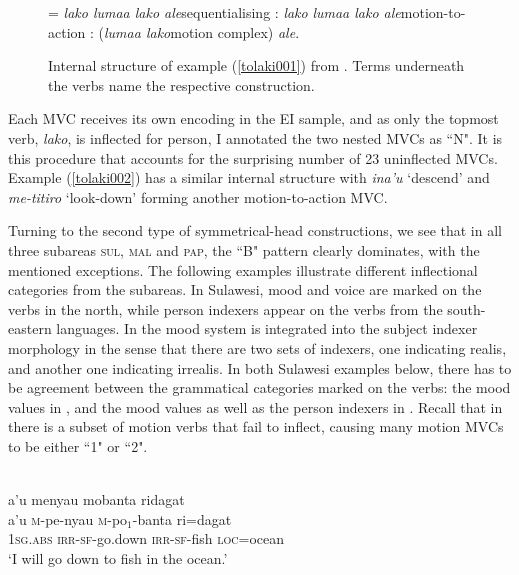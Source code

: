 \begin{figure}[h]
\jtree[xunit=8em,yunit=1em]
\! = {\textit{lako lumaa lako ale}}{sequentialising}
: {\textit{lako}} {\textit{lumaa lako ale}}{motion-to-action}
: ({\textit{lumaa lako}}{motion complex}) {\textit{ale}}.
\endjtree
\caption[Internal structure of example (\ref{tolaki001}) from ]{Internal structure of example (\ref{tolaki001}) from . Terms underneath the verbs name the respective construction.}
\label{figure:tolakiMVC}
\end{figure}

Each MVC receives its own encoding in the EI sample, and as only the topmost verb, \textit{lako}, is inflected for person, I annotated the two nested MVCs as ``N". It is this procedure that accounts for the surprising number of 23 uninflected  MVCs. Example (\ref{tolaki002}) has a similar internal structure with \textit{ina'u} `descend' and \textit{me-titiro} `look-down' forming another motion-to-action MVC.

Turning to the second type of symmetrical-head constructions, we see that in all three subareas \textsc{sul}, \textsc{mal} and \textsc{pap}, the ``B" pattern clearly dominates, with the mentioned exceptions. The following examples illustrate different inflectional categories from the subareas. In Sulawesi, mood and voice are marked on the verbs in the north, while person indexers appear on the verbs from the south-eastern languages. In  the mood system is integrated into the subject indexer morphology in the sense that there are two sets of indexers, one indicating realis, and another one indicating irrealis. In both Sulawesi examples below, there has to be agreement between the grammatical categories marked on the verbs: the mood values in , and the mood values as well as the person indexers in . Recall that in  there is a subset of motion verbs that fail to inflect, causing many motion MVCs to be either ``1" or ``2".

\ea 
{}\\
\glll a'u menyau mobanta ridagat \\
a'u \textsc{m}-pe-nyau \textsc{m}-po$_1$-banta ri=dagat \\
1\textsc{sg}.\textsc{abs} \textsc{irr}-\textsc{sf}-go.down \textsc{irr}-\textsc{sf}-fish \textsc{loc}=ocean \\
\glft `I will go down to fish in the ocean.'\\ 
\z

